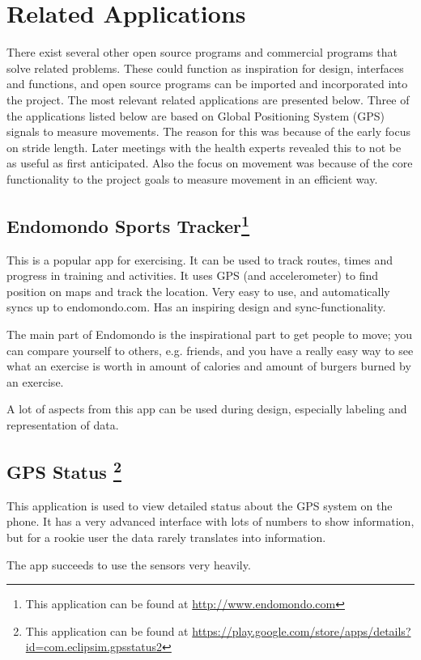 \section{Related Applications}
There exist several other open source programs and commercial programs that solve related problems. These could function as inspiration for design, interfaces and functions, and open source programs can be imported and incorporated into the project. The most relevant related applications are presented below. Three of the applications listed below are based on Global Positioning System (GPS) signals to measure movements. The reason for this was because of the early focus on stride length. Later meetings with the health experts revealed this to not be as useful as first anticipated. Also the focus on movement was because of the core functionality to the project goals to measure movement in an efficient way.

\subsection{Endomondo Sports Tracker\footnote{This application can be found at \url{http://www.endomondo.com}}}
This is a popular app for exercising. It can be used to track routes, times and progress in training and activities. It uses GPS (and accelerometer) to find position on maps and track the location. Very easy to use, and automatically syncs up to endomondo.com. Has an inspiring design and sync-functionality.

The main part of Endomondo is the inspirational part to get people to move; you can compare yourself to others, e.g. friends, and you have a really easy way to see what an exercise is worth in amount of calories and amount of burgers burned by an exercise.

A lot of aspects from this app can be used during design, especially labeling and representation of data.

\subsection{GPS Status \footnote{This application can be found at \url{https://play.google.com/store/apps/details? id=com.eclipsim.gpsstatus2}}}
This application is used to view detailed status about the GPS system on the phone. It has a very advanced interface with lots of numbers to show information, but for a rookie user the data rarely translates into information.

The app succeeds to use the sensors very heavily.

